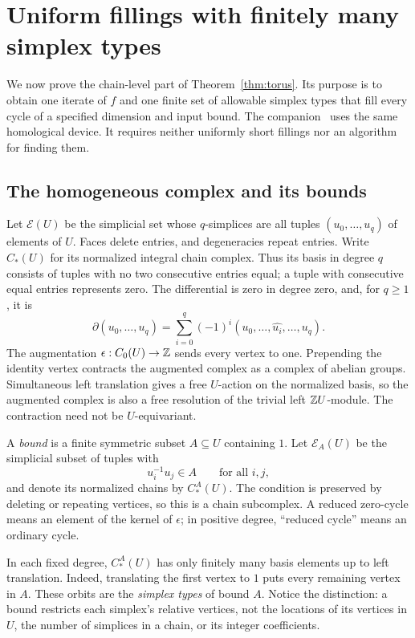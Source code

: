 \section{Uniform fillings with finitely many simplex types}
\label{sec:fillings}

We now prove the chain-level part of Theorem~\ref{thm:torus}.  Its
purpose is to obtain one iterate of $f$ and one finite set of allowable
simplex types that fill every cycle of a specified dimension and input
bound.  The companion~\cite[Lemma~2.5 and Proposition~2.6]{OpenAIOvergroups}
uses the same homological
device.  It requires neither uniformly short fillings
nor an algorithm for finding them.

\subsection{The homogeneous complex and its bounds}

Let $\mathcal E(U)$ be the simplicial set whose $q$-simplices are all
tuples $(u_0,\ldots,u_q)$ of elements of $U$.  Faces delete entries, and
degeneracies repeat entries.  Write $C_*(U)$ for its normalized integral
chain complex.  Thus its basis in degree $q$ consists of tuples with
no two consecutive entries equal; a tuple with consecutive equal
entries represents zero.  The differential is zero in degree zero,
and, for $q\ge1$, it is
\[
 \partial(u_0,\ldots,u_q)
   =\sum_{i=0}^q(-1)^i(u_0,\ldots,\widehat{u_i},\ldots,u_q).
\]
The augmentation $\epsilon:C_0(U)\to\mathbb Z$ sends every vertex to one.
Prepending the identity vertex contracts the augmented complex as a
complex of abelian groups.  Simultaneous left translation gives a free
$U$-action on the normalized basis, so the augmented complex is also
a free resolution of the trivial left $\mathbb Z U$-module.  The contraction
need not be $U$-equivariant.

A \emph{bound} is a finite symmetric subset $A\subseteq U$ containing
$1$.  Let $\mathcal E_A(U)$ be the simplicial subset of tuples with
\[
 u_i^{-1}u_j\in A\qquad\text{for all }i,j,
\]
and denote its normalized chains by $C_*^A(U)$.  The condition is
preserved by deleting or repeating vertices, so this is a chain
subcomplex.  A reduced zero-cycle means an element of the kernel of
$\epsilon$; in positive degree, ``reduced cycle'' means an ordinary
cycle.

In each fixed degree, $C_*^A(U)$ has only finitely many basis elements
up to left translation.  Indeed, translating the first vertex to $1$
puts every remaining vertex in $A$.  These orbits are the
\emph{simplex types} of bound $A$.  Notice the distinction: a bound
restricts each simplex's relative vertices, not the locations of its
vertices in $U$, the number of simplices in a chain, or its integer
coefficients.

